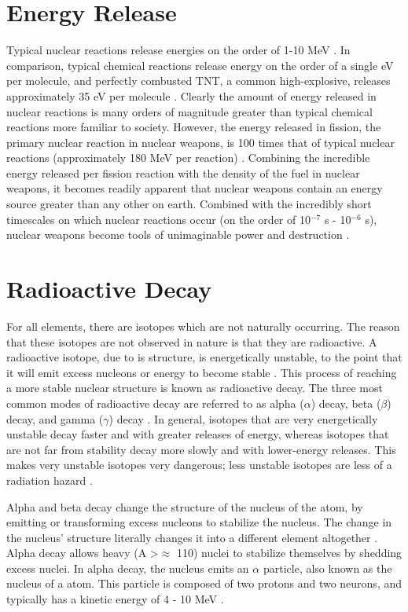 \documentclass{report}
\begin{document}
\section{Energy Release}

Typical nuclear reactions release energies on the order of 1-10 MeV \cite{Prussin2014}. In comparison, typical chemical reactions release energy on the order of a single eV per molecule, and perfectly combusted TNT, a common high-explosive, releases approximately 35 eV per molecule \cite{Prussin2014}. Clearly the amount of energy released in nuclear reactions is many orders of magnitude greater than typical chemical reactions more familiar to society. However, the energy released in fission, the primary nuclear reaction in nuclear weapons, is 100 times that of typical nuclear reactions (approximately 180 MeV per reaction) \cite{krane1987introductory,Loveland2005}. Combining the incredible energy released per fission reaction with the density of the fuel in nuclear weapons, it becomes readily apparent that nuclear weapons contain an energy source greater than any other on earth. Combined  with the incredibly short timescales on which nuclear reactions occur (on the order of 10\(^{-7}\) s - 10\(^{-6}\) s),  nuclear weapons become tools of unimaginable power and destruction \cite{Loveland2005,Cochran1994}.  


\section{Radioactive Decay}

For all elements, there are isotopes which are not naturally occurring. The reason that these isotopes are not observed in nature is that they are radioactive. A radioactive isotope, due to is structure, is energetically unstable, to the point that it will emit excess nucleons or energy to become stable \cite{Loveland2005}. This process of reaching a more stable nuclear structure is known as radioactive decay. The three most common modes of radioactive decay are referred to as alpha (\(\alpha\)) decay, beta (\(\beta\)) decay, and gamma (\(\gamma\)) decay \cite{Loveland2005}. In general, isotopes that are very energetically unstable decay faster and with greater releases of energy, whereas isotopes that are not far from stability decay more slowly and with lower-energy releases. This makes very unstable isotopes very dangerous; less unstable isotopes are less of a radiation hazard \cite{krane1987introductory}.

Alpha and beta decay change the structure of the nucleus of the atom, by emitting or transforming excess nucleons to stabilize the nucleus. The change in the nucleus' structure literally changes it into a different element altogether \cite{krane1987introductory}. Alpha decay allows heavy (A \textgreater \(\approx\) 110) nuclei to stabilize themselves by shedding excess nuclei. In alpha decay, the nucleus emits an \(\alpha\) particle, also known as the nucleus of a  atom. This particle is composed of two protons and two neurons, and typically has a kinetic energy of 4 - 10 MeV \cite{krane1987introductory}. 
\end{document}
